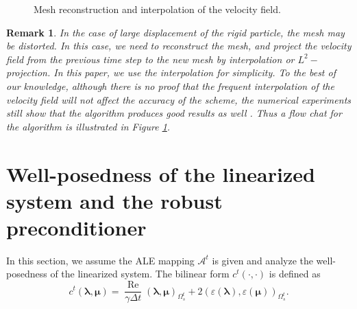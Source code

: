 \documentclass{article}
\newcommand{\Reynolds}{{\operatorname{Re}}}
\newtheorem{remark}[theorem]{Remark}
\begin{document}
\begin{figure}[htbp]
{

    }
    \caption{Mesh reconstruction and interpolation of the velocity field.}
    \label{fig:mesh_reconstruction}
\end{figure}

\begin{remark}
In the case of large displacement of the rigid particle, the mesh may be distorted. In this case, we need to reconstruct the mesh, and project the velocity field from the previous time step to the new mesh by interpolation or $L^2-$projection. In this paper, we use the interpolation for simplicity.
To the best of our knowledge, although there is no proof that the frequent interpolation of the velocity field will not affect the accuracy of the scheme, the numerical experiments still show that the algorithm produces good results as well \cite{gawlik2014high}. Thus a flow chat for the algorithm is illustrated in Figure \ref{fig:mesh_reconstruction}.
\end{remark}



\section{Well-posedness of the linearized system and the robust preconditioner}\label{sec:preconditioner}

In this section, we assume the ALE mapping $\mathcal{A}^t$ is given and analyze the well-posedness of the linearized system. The bilinear form $c^t(\cdot,\cdot)$ is defined as
\begin{equation}
    c^t(\boldsymbol{\lambda},\boldsymbol{\mu}) = \frac{\Reynolds}{\gamma\Delta t}(\boldsymbol{\lambda},\boldsymbol{\mu})_{\Omega_s^t} + 2(\varepsilon(\boldsymbol{\lambda}),\varepsilon(\boldsymbol{\mu}))_{\Omega_s^t}.
\end{equation}
\end{document}
